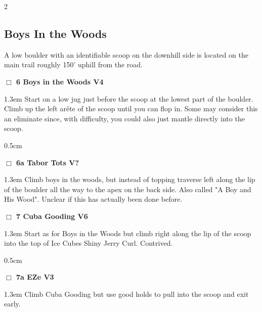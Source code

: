 	\begin{multicols}{2}
\needspace{10em}
\subsection*{Boys In the Woods}\label{bf:Boys In the Woods}
A low boulder with an identifiable scoop on the downhill side is located on the main trail roughly 150' uphill from the road.\\
\needspace{2em}
\label{rt:Boys in the Woods}
\colorbox{RoyalBlue!20}{
\parbox{0.95\linewidth}{
\hspace{-1ex}\textbf{$\Box$
6 Boys in the Woods V4  
}}}
\begin{adjustwidth}{1.3em}{}			
Start on a low jug just before the scoop at the lowest part of the boulder. Climb up the left arête of the scoop until you can flop in. Some may consider this an eliminate since, with difficulty, you could also just mantle directly into the scoop.
\end{adjustwidth}
\begin{adjustwidth}{0.5cm}{}				
\needspace{4em}
\needspace{2em}
\label{vr:Tabor Tots}
\colorbox{black!20}{
\parbox{0.95\linewidth}{
\hspace{-1ex}\textbf{$\Box$
6a Tabor Tots V?  
}}}
\begin{adjustwidth}{1.3em}{}			
Climb boys in the woods, but instead of topping traverse left along the lip of the boulder all the way to the apex on the back side. Also called "A Boy and His Wood". Unclear if this has actually been done before.
\end{adjustwidth}
\end{adjustwidth}
\needspace{2em}
\label{rt:Cuba Gooding}
\colorbox{RoyalBlue!20}{
\parbox{0.95\linewidth}{
\hspace{-1ex}\textbf{$\Box$
7 Cuba Gooding V6  
}}}
\begin{adjustwidth}{1.3em}{}			
Start as for Boys in the Woods but climb right along the lip of the scoop into the top of Ice Cubes Shiny Jerry Curl. Contrived.
\end{adjustwidth}
\begin{adjustwidth}{0.5cm}{}				
\needspace{4em}
\needspace{2em}
\label{vr:EZe}
\colorbox{green!20}{
\parbox{0.95\linewidth}{
\hspace{-1ex}\textbf{$\Box$
7a EZe V3  
}}}
\begin{adjustwidth}{1.3em}{}			
Climb Cuba Gooding but use good holds to pull into the scoop and exit early.

\end{adjustwidth}
\end{adjustwidth}
\end{multicols}
